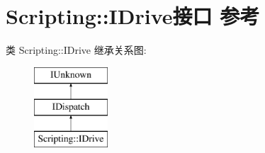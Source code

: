\hypertarget{interface_scripting_1_1_i_drive}{}\section{Scripting\+:\+:I\+Drive接口 参考}
\label{interface_scripting_1_1_i_drive}
类 Scripting\+:\+:I\+Drive 继承关系图\+:\begin{figure}[H]
\begin{center}
\leavevmode
\includegraphics[height=3.000000cm]{interface_scripting_1_1_i_drive}
\end{center}
\end{figure}
